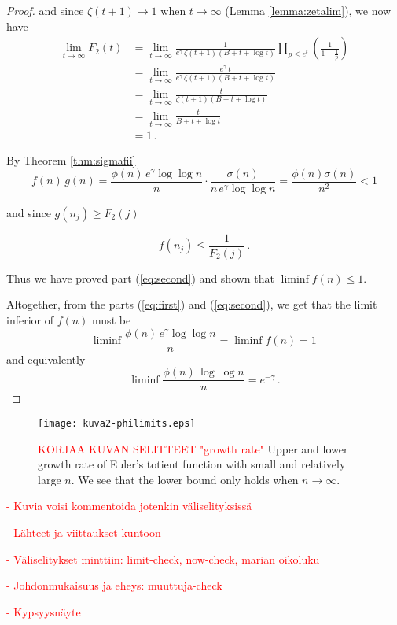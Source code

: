 \documentclass{article}
\begin{document}
\begin{theorem}
\begin{proof}
and since $\zeta(t+1)\rightarrow 1$ when $t\rightarrow\infty$ (Lemma \ref{lemma:zetalim}), we now have
\begin{align*}
    \lim_{t \rightarrow \infty} F_2(t) & = \lim_{t \rightarrow \infty} \frac{1}{e^\gamma\,\zeta(t+1)(B+t+\log t)} \prod_{p\leq e^t} \left(\frac{1}{1-\frac{1}{p}}\right)\\
    & = \lim_{t \rightarrow \infty} \frac{e^\gamma\,t}{e^\gamma\,\zeta(t+1)(B+t+\log t)}\\
    & = \lim_{t \rightarrow \infty} \frac{t}{\zeta(t+1)(B+t+\log t)}\\
    & = \lim_{t \rightarrow \infty} \frac{t}{B+t+\log t}\\
    & = 1\,.
\end{align*}

By Theorem \ref{thm:sigmafii}
\begin{equation*}
    f(n)\,g(n) = \frac{\phi(n)\,e^\gamma \log\log n}{n} \cdot \frac{\sigma(n)}{n\,e^\gamma \log\log n} = \frac{\phi(n)\sigma(n)}{n^2}<1
\end{equation*}

and since $g(n_j) \geq F_2(j)$

\begin{equation*}
    f(n_j)\leq \frac{1}{F_2(j)}\,.
\end{equation*}

Thus we have proved part (\ref{eq:second}) and shown that $\liminf{f(n)\leq 1}$.

Altogether, from the parts (\ref{eq:first}) and (\ref{eq:second}), we get that the limit inferior of $f(n)$ must be
\begin{equation*}
    \liminf{\frac{\phi(n)\,e^\gamma \log\log n}{n}}=\liminf{f(n)}=1\,
\end{equation*}
and equivalently
\begin{equation*}
    \liminf{\frac{\phi(n)\,\log\log n}{n}}=e^{-\gamma}\,.
\end{equation*}
\end{proof}
\end{theorem}

\begin{figure}[!htb]
    \centering
    \texttt{[image: kuva2-philimits.eps]}
    \caption{\textcolor{red}{KORJAA KUVAN SELITTEET "growth rate"}
    Upper and lower growth rate of Euler's totient function with small and relatively large $n$. We see that the lower bound only holds when $n\rightarrow\infty$.}
    \label{fig:k2}
\end{figure}

\textcolor{red}{- Kuvia voisi kommentoida jotenkin väliselityksissä}

\textcolor{red}{- Lähteet ja viittaukset kuntoon}

\textcolor{red}{- Väliselitykset minttiin: limit-check, now-check, marian oikoluku}

\textcolor{red}{- Johdonmukaisuus ja eheys: muuttuja-check}

\textcolor{red}{- Kypsyysnäyte}

\clearpage
\nocite{*}
\printbibliography
\end{document}
